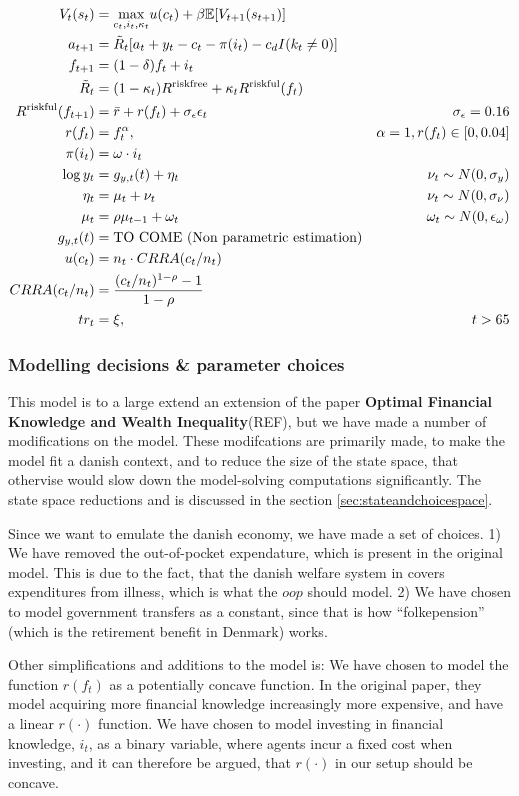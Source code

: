 \begin{align}
    V_t(s_t) &= \underset{c_t, i_t, \kappa_t}{\max} u(c_t) + \beta \mathbb{E} [V_{t+1}(s_{t+1})] \\
    a_{t+1} &= \tilde{R}_t [a_t + y_t - c_t - \pi(i_t) - c_d I(k_t \neq 0)] \\
    f_{t+1} &= (1-\delta)f_t + i_t \\
    \tilde{R}_t &= (1-\kappa_t) R^{\text{riskfree}} + \kappa_t R^{\text{riskful}}(f_t) \\
    R^{\text{riskful}}(f_{t+1}) &= \bar{r} + r(f_t) + \sigma_{\epsilon} \epsilon_t & \sigma_\epsilon = 0.16 \\
    r(f_t) &= f_t^{\alpha}, &\alpha = 1, r(f_t)\in [0, 0.04] \\
    \pi(i_t) &= \omega \cdot i_t \\
    \log y_t &= g_{y, t}(t) + \eta_{t} &\nu_{t} \sim N(0, \sigma_y) \\
    \eta_t &= \mu_{t} + \nu_t &\nu_t \sim N(0, \sigma_\nu) \\
    \mu_t &= \rho \mu_{t-1} + \omega_t &\omega_t\sim N(0, \epsilon_\omega) \\
    g_{y,t}(t) &= \text{TO COME (Non parametric estimation)}\\
    u (c_t) &= n_t \cdot CRRA(c_t / n_t) \\
    CRRA(c_t / n_t) &= \frac{(c_t/n_t)^{1-\rho} - 1}{1-\rho} \\
    tr_t &= \xi, &t>65
\end{align}

\subsubsection{Modelling decisions \& parameter choices}

This model is to a large extend an extension of the paper \textbf{Optimal Financial Knowledge and Wealth Inequality}(REF), but we have made a number of modifications on the model. These modifcations are primarily made, to make the model fit a danish context, and to reduce the size of the state space, that othervise would slow down the model-solving computations significantly. The state space reductions and is discussed in the section \ref{sec:stateandchoicespace}.

Since we want to emulate the danish economy, we have made a set of choices. 1) We have removed the out-of-pocket expendature, which is present in the original model. This is due to the fact, that the danish welfare system in covers expenditures from illness, which is what the $oop$ should model. 2) We have chosen to model government transfers as a constant, since that is how ``folkepension'' (which is the retirement benefit in Denmark) works.

Other simplifications and additions to the model is: We have chosen to model the function $r(f_t)$ as a potentially concave function. In the original paper, they model acquiring more financial knowledge increasingly more expensive, and have a linear $r(\cdot)$ function. We have chosen to model investing in financial knowledge, $i_t$, as a binary variable, where agents incur a fixed cost when investing, and it can therefore be argued, that $r(\cdot)$ in our setup should be concave.


